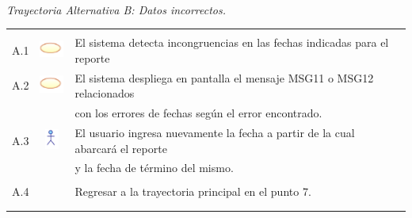 \documentclass[10pt,spanish]{article}
\providecommand{\tabularnewline}{\\}
\begin{document}
\textit{\large \\Trayectoria Alternativa B: Datos incorrectos.}

\begin{tabular}{ccl}
	& & \tabularnewline
	
	A.1 & \includegraphics{sistema} & El sistema detecta incongruencias en las fechas indicadas para el reporte\tabularnewline
		
	A.2 & \includegraphics{sistema} & El sistema despliega en pantalla el mensaje MSG11 o MSG12 relacionados \tabularnewline
	& & con los errores de fechas según el error encontrado. 	\tabularnewline	
	
	A.3 & \includegraphics{actor} & El usuario ingresa nuevamente la fecha a partir de la cual abarcará el reporte   \tabularnewline
& &	y la fecha de término del mismo.\tabularnewline    \tabularnewline    
	
	A.4 & & Regresar a la trayectoria principal en el punto 7.\tabularnewline

	
	\tabularnewline\tabularnewline	
	\end{tabular}

\end{document}
